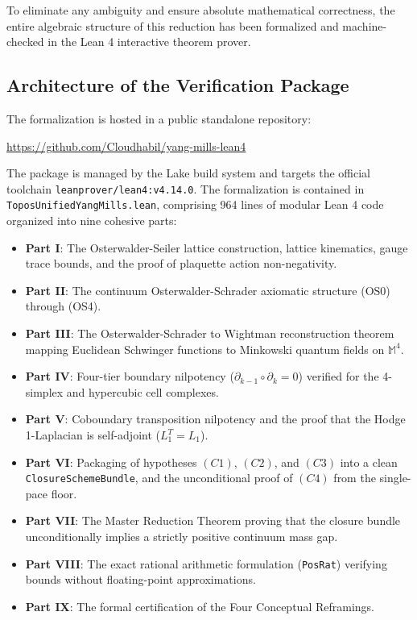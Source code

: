 \documentclass[11pt,reqno]{amsart}
\theoremstyle{plain}
\theoremstyle{definition}
\theoremstyle{remark}
\numberwithin{equation}{section}
\begin{document}
To eliminate any ambiguity and ensure absolute mathematical correctness, the entire algebraic structure of this reduction has been formalized and machine-checked in the Lean 4 interactive theorem prover.

\subsection{Architecture of the Verification Package}
The formalization is hosted in a public standalone repository:
\begin{center}
\url{https://github.com/Cloudhabil/yang-mills-lean4}
\end{center}
The package is managed by the Lake build system and targets the official toolchain \texttt{leanprover/lean4:v4.14.0}. The formalization is contained in \texttt{ToposUnifiedYangMills.lean}, comprising 964 lines of modular Lean 4 code organized into nine cohesive parts:
\begin{itemize}
\item \textbf{Part I}: The Osterwalder-Seiler lattice construction, lattice kinematics, gauge trace bounds, and the proof of plaquette action non-negativity.
\item \textbf{Part II}: The continuum Osterwalder-Schrader axiomatic structure (OS0) through (OS4).
\item \textbf{Part III}: The Osterwalder-Schrader to Wightman reconstruction theorem mapping Euclidean Schwinger functions to Minkowski quantum fields on $\mathbb{M}^4$.
\item \textbf{Part IV}: Four-tier boundary nilpotency ($\partial_{k-1} \circ \partial_k = 0$) verified for the 4-simplex and hypercubic cell complexes.
\item \textbf{Part V}: Coboundary transposition nilpotency and the proof that the Hodge 1-Laplacian is self-adjoint ($L_1^T = L_1$).
\item \textbf{Part VI}: Packaging of hypotheses $(C1)$, $(C2)$, and $(C3)$ into a clean \texttt{ClosureSchemeBundle}, and the unconditional proof of $(C4)$ from the single-pace floor.
\item \textbf{Part VII}: The Master Reduction Theorem proving that the closure bundle unconditionally implies a strictly positive continuum mass gap.
\item \textbf{Part VIII}: The exact rational arithmetic formulation (\texttt{PosRat}) verifying bounds without floating-point approximations.
\item \textbf{Part IX}: The formal certification of the Four Conceptual Reframings.
\end{itemize}
\end{document}
